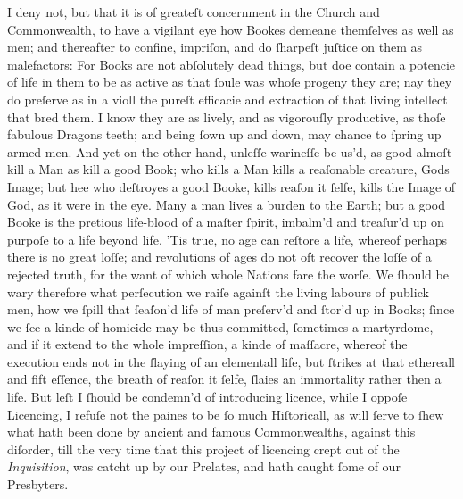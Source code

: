 I deny not, but that it is of greateſt concernment in the Church and
Commonwealth, to have a vigilant eye how Bookes demeane themſelves as well as
men; and thereafter to confine, impriſon, and do ſharpeſt juſtice on them as
malefactors: For Books are not abſolutely dead things, but doe contain a
potencie of life in them to be as active as that ſoule was whoſe progeny they
are; nay they do preſerve as in a violl the pureſt efficacie and extraction of
that living intellect that bred them.  I know they are as lively, and as
vigorouſly productive, as thoſe fabulous Dragons teeth; and being ſown up and
down, may chance to ſpring up armed men.  And yet on the other hand, unleſſe
warineſſe be us'd, as good almoſt kill a Man as kill a good Book; who kills a
Man kills a reaſonable creature, Gods Image; but hee who deſtroyes a good Booke,
kills reaſon it ſelfe, kills the Image of God, as it were in the eye.  Many a
man lives a burden to the Earth; but a good Booke is the pretious life-blood of
a maſter ſpirit, imbalm'd and treaſur'd up on purpoſe to a life beyond life.
'Tis true, no age can reſtore a life, whereof perhaps there is no great loſſe;
and revolutions of ages do not oft recover the loſſe of a rejected truth, for
the want of which whole Nations fare the worſe.  We ſhould be wary therefore
what perſecution we raiſe againſt the living labours of publick men, how we
ſpill that ſeaſon'd life of man preſerv'd and ſtor'd up in Books; ſince we ſee a
kinde of homicide may be thus committed, ſometimes a martyrdome, and if it
extend to the whole impreſſion, a kinde of maſſacre, whereof the execution ends
not in the ſlaying of an elementall life, but ſtrikes at that ethereall and fift
eſſence, the breath of reaſon it ſelfe, ſlaies an immortality rather then a
life.  But leſt I ſhould be condemn'd of introducing licence, while I oppoſe
Licencing, I refuſe not the paines to be ſo much Hiſtoricall, as will ſerve to
ſhew what hath been done by ancient and famous Commonwealths, against this
diſorder, till the very time that this project of licencing crept out of the
\textit{Inquisition}, was catcht up by our Prelates, and hath caught ſome of our
Presbyters.

